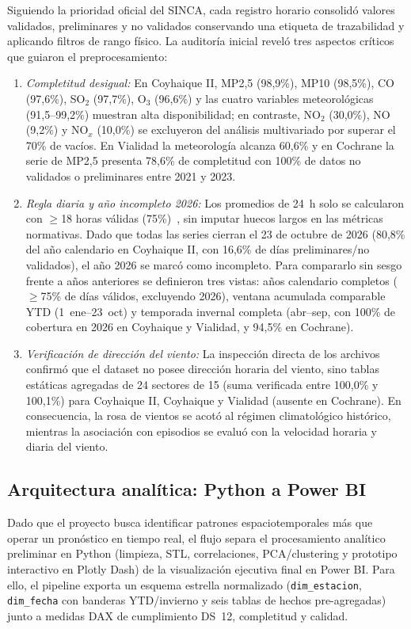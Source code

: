 \documentclass[conference]{IEEEtran}
\begin{document}
Siguiendo la prioridad oficial del SINCA, cada registro horario consolid{\'o} valores validados, preliminares y no validados conservando una etiqueta de trazabilidad y aplicando filtros de rango f{\'i}sico. La auditor{\'i}a inicial revel{\'o} tres aspectos cr{\'i}ticos que guiaron el preprocesamiento:
\begin{enumerate}
\item \textit{Completitud desigual:} En Coyhaique II, MP2,5 (98,9\%), MP10 (98,5\%), CO (97,6\%), SO$_2$ (97,7\%), O$_3$ (96,6\%) y las cuatro variables meteorol{\'o}gicas (91,5--99,2\%) muestran alta disponibilidad; en contraste, NO$_2$ (30,0\%), NO (9,2\%) y NO$_x$ (10,0\%) se excluyeron del an{\'a}lisis multivariado por superar el 70\% de vac{\'i}os. En Vialidad la meteorolog{\'i}a alcanza 60,6\% y en Cochrane la serie de MP2,5 presenta 78,6\% de completitud con 100\% de datos no validados o preliminares entre 2021 y 2023.
\item \textit{Regla diaria y a{\~n}o incompleto 2026:} Los promedios de 24~h solo se calcularon con $\geq$18 horas v{\'a}lidas (75\%)~\cite{mma2011ds12}, sin imputar huecos largos en las m{\'e}tricas normativas. Dado que todas las series cierran el 23 de octubre de 2026 (80,8\% del a{\~n}o calendario en Coyhaique II, con 16,6\% de d{\'i}as preliminares/no validados), el a{\~n}o 2026 se marc{\'o} como incompleto. Para compararlo sin sesgo frente a a{\~n}os anteriores se definieron tres vistas: a{\~n}os calendario completos ($\geq$75\% de d{\'i}as v{\'a}lidos, excluyendo 2026), ventana acumulada comparable YTD (1~ene--23~oct) y temporada invernal completa (abr--sep, con 100\% de cobertura en 2026 en Coyhaique y Vialidad, y 94,5\% en Cochrane).
\item \textit{Verificaci{\'o}n de direcci{\'o}n del viento:} La inspecci{\'o}n directa de los archivos confirm{\'o} que el dataset no posee direcci{\'o}n horaria del viento, sino tablas est{\'a}ticas agregadas de 24 sectores de 15\textdegree{} (suma verificada entre 100,0\% y 100,1\%) para Coyhaique II, Coyhaique y Vialidad (ausente en Cochrane). En consecuencia, la rosa de vientos se acot{\'o} al r{\'e}gimen climatol{\'o}gico hist{\'o}rico, mientras la asociaci{\'o}n con episodios se evalu{\'o} con la velocidad horaria y diaria del viento.
\end{enumerate}

\subsection{Arquitectura anal{\'i}tica: Python a Power BI}
Dado que el proyecto busca identificar patrones espaciotemporales m{\'a}s que operar un pron{\'o}stico en tiempo real, el flujo separa el procesamiento anal{\'i}tico preliminar en Python (limpieza, STL, correlaciones, PCA/clustering y prototipo interactivo en Plotly Dash) de la visualizaci{\'o}n ejecutiva final en Power BI. Para ello, el pipeline exporta un esquema estrella normalizado (\texttt{dim\_estacion}, \texttt{dim\_fecha} con banderas YTD/invierno y seis tablas de hechos pre-agregadas) junto a medidas DAX de cumplimiento DS~12, completitud y calidad.
\end{document}
